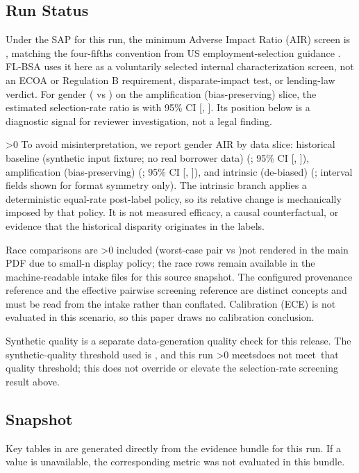 \subsection{Run Status}
Under the SAP for this run, the minimum Adverse Impact Ratio (AIR) screen is \AirMin{}, matching the four-fifths convention from US employment-selection guidance \citep{eeoc_uniform_guidelines}. FL-BSA uses it here as a voluntarily selected internal characterization screen, not an ECOA or Regulation B requirement, disparate-impact test, or lending-law verdict. For gender (\GenderProtectedGroup{} vs \GenderReferenceGroup{}) on the amplification (bias-preserving) slice, the estimated selection-rate ratio is \GenderAIR{} with 95\% CI [\GenderAIRLCI{}, \GenderAIRUCI{}]. Its position below \AirMin{} is a diagnostic signal for reviewer investigation, not a legal finding.

\ifnum\GenderSlicesAvailable>0\relax
\noindent To avoid misinterpretation, we report gender AIR by data slice: historical baseline (synthetic input fixture; no real borrower data) (\GenderAIRHistorical{}; 95\% CI [\GenderAIRHistoricalLCI{}, \GenderAIRHistoricalUCI{}]), amplification (bias-preserving) (\GenderAIRAmplification{}; 95\% CI [\GenderAIRAmplificationLCI{}, \GenderAIRAmplificationUCI{}]), and intrinsic (de-biased) (\GenderAIRIntrinsic{}; interval fields shown for format symmetry only). The intrinsic branch applies a deterministic equal-rate post-label policy, so its relative change is mechanically imposed by that policy. It is not measured efficacy, a causal counterfactual, or evidence that the historical disparity originates in the labels.
\fi

\noindent Race comparisons are \ifnum\ShowRaceMain>0 included (worst-case pair vs \RaceReferenceGroup{})\else not rendered in the main PDF due to small-n display policy; the race rows remain available in the machine-readable intake files for this source snapshot\fi. The configured provenance reference and the effective pairwise screening reference are distinct concepts and must be read from the intake rather than conflated. Calibration (ECE) is not evaluated in this scenario, so this paper draws no calibration conclusion.

\noindent Synthetic quality is a separate data-generation quality check for this release. The synthetic-quality threshold used is \SqThresholdUsed{}, and this run \ifnum\SqThresholdMet>0 meets\else does not meet\fi\ that quality threshold; this does not override or elevate the selection-rate screening result above.

\subsection{Snapshot}
Key tables in  are generated directly from the evidence bundle for this run. If a value is unavailable, the corresponding metric was not evaluated in this bundle.
